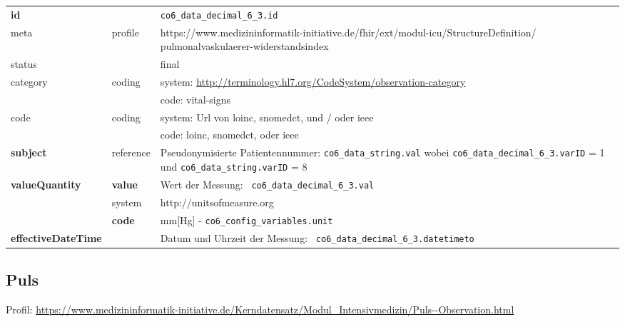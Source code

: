 \begin{longtable}{|l|l|p{7.5cm}|}
	\hline
	\rowcolor{lightgray} \multicolumn{3}{|l|}{Data Mapping (inhaltlich)} \\ \hline
	\textbf{id} &  & \texttt{co6\_data\_decimal\_6\_3.id} \\ \hline
	meta & profile & https://www.medizininformatik-initiative.de/fhir/ext/modul-icu/StructureDefinition/
	pulmonalvaskulaerer-widerstandsindex \\ \hline 
	status &  & final   \\ \hline 
	category & coding & system: \url{http://terminology.hl7.org/CodeSystem/observation-category} \\
	\cline{3-3}
	& & code: vital-signs\\ \hline
	code & coding & system: Url von \ac{loinc}, \ac{snomedct}, und / oder \ac{ieee} \\ 
	\cline{3-3} 
	&  & code: \ac{loinc}, \ac{snomedct}, oder \ac{ieee} \\ \hline
	\textbf{subject} & reference & Pseudonymisierte Patientennummer: \texttt{co6\_data\_string.val} wobei \texttt{co6\_data\_decimal\_6\_3.varID} = 1 und \texttt{co6\_data\_string.varID} = 8 \\ \hline
	\textbf{valueQuantity}  & \textbf{value} & Wert der Messung: \texttt{
		co6\_data\_decimal\_6\_3.val} \\
	\cline{2-3}
	& system & http://unitsofmeasure.org \\
	\cline{2-3}
	& \textbf{code} & mm[Hg] - \texttt{co6\_config\_variables.unit} \\ \hline
	\textbf{effectiveDateTime}  & & Datum und Uhrzeit der Messung: \texttt{
		co6\_data\_decimal\_6\_3.datetimeto} \\
	\hline
\end{longtable}


\subsection{Puls}

Profil: \url{https://www.medizininformatik-initiative.de/Kerndatensatz/Modul_Intensivmedizin/Puls--Observation.html}

